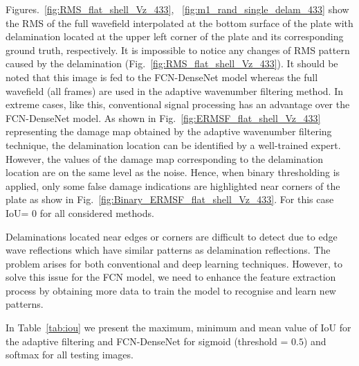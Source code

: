 Figures.~\ref{fig:RMS_flat_shell_Vz_433}, ~\ref{fig:m1_rand_single_delam_433} show the RMS of the full wavefield interpolated at the bottom surface of the plate with delamination located at the upper left corner of the plate and its corresponding ground truth, respectively.
It is impossible to notice any changes of RMS pattern caused by the delamination (Fig.~\ref{fig:RMS_flat_shell_Vz_433}).
It should be noted that this image is fed to the FCN-DenseNet model whereas the full wavefield (all frames) are used in the adaptive wavenumber filtering method.
In extreme cases, like this, conventional signal processing has an advantage over the FCN-DenseNet model.
As shown in Fig.~\ref{fig:ERMSF_flat_shell_Vz_433} representing the damage map obtained by the adaptive wavenumber filtering technique, the delamination location can be identified by a well-trained expert. 
However, the values of the damage map corresponding to the delamination location are on the same level as the noise.
Hence, when binary thresholding is applied, only some false damage indications are highlighted near corners of the plate as show in Fig.~\ref{fig:Binary_ERMSF_flat_shell_Vz_433}. 
For this case IoU= \(0\) for all considered methods.
 
Delaminations located near edges or corners are difficult to detect due to edge wave reflections which have similar patterns as delamination reflections. 
The problem arises for both conventional and deep learning techniques. 
However, to solve this issue for the FCN model, we need to enhance the feature extraction process by obtaining more data to train the model to recognise and learn new patterns.	

In Table~\ref{tab:iou} we present the maximum, minimum and mean value of IoU for the adaptive filtering and FCN-DenseNet for sigmoid (threshold = \(0.5\)) and softmax for all testing images.
	\begin{table}
	 \renewcommand{\arraystretch}{1.3}
		\centering
		\caption{IoU for all models}
		\label{tab:iou}
	\end{table}
	

